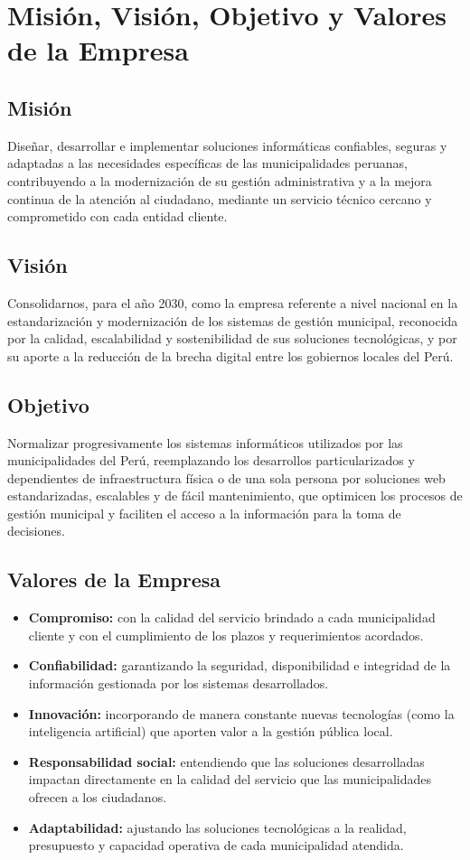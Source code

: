 \documentclass[12pt,a4paper]{report}
\begin{document}
\section{Misión, Visión, Objetivo y Valores de la Empresa}

\subsection{Misión}
Diseñar, desarrollar e implementar soluciones informáticas confiables, seguras y adaptadas a las necesidades específicas de las municipalidades peruanas, contribuyendo a la modernización de su gestión administrativa y a la mejora continua de la atención al ciudadano, mediante un servicio técnico cercano y comprometido con cada entidad cliente.

\subsection{Visión}
Consolidarnos, para el año 2030, como la empresa referente a nivel nacional en la estandarización y modernización de los sistemas de gestión municipal, reconocida por la calidad, escalabilidad y sostenibilidad de sus soluciones tecnológicas, y por su aporte a la reducción de la brecha digital entre los gobiernos locales del Perú.

\subsection{Objetivo}
Normalizar progresivamente los sistemas informáticos utilizados por las municipalidades del Perú, reemplazando los desarrollos particularizados y dependientes de infraestructura física o de una sola persona por soluciones web estandarizadas, escalables y de fácil mantenimiento, que optimicen los procesos de gestión municipal y faciliten el acceso a la información para la toma de decisiones.

\subsection{Valores de la Empresa}

\begin{itemize}
  \item \textbf{Compromiso:} con la calidad del servicio brindado a cada municipalidad cliente y con el cumplimiento de los plazos y requerimientos acordados.
  \item \textbf{Confiabilidad:} garantizando la seguridad, disponibilidad e integridad de la información gestionada por los sistemas desarrollados.
  \item \textbf{Innovación:} incorporando de manera constante nuevas tecnologías (como la inteligencia artificial) que aporten valor a la gestión pública local.
  \item \textbf{Responsabilidad social:} entendiendo que las soluciones desarrolladas impactan directamente en la calidad del servicio que las municipalidades ofrecen a los ciudadanos.
  \item \textbf{Adaptabilidad:} ajustando las soluciones tecnológicas a la realidad, presupuesto y capacidad operativa de cada municipalidad atendida.
\end{itemize}
\end{document}
